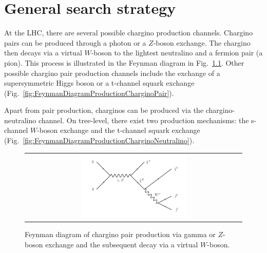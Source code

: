 \FloatBarrier
\chapter{General search strategy}
\label{sec:GeneralSearchStrategy}

At the LHC, there are several possible chargino production channels. 
Chargino pairs can be produced through a photon or a $Z$-boson exchange. 
The chargino then decays via a virtual $W$-boson to the lightest neutralino and a fermion pair (\eg a pion). 
This process is illustrated in the Feynman diagram in Fig.~\ref{fig:FeynmanDiagram}.
Other possible chargino pair production channels include the exchange of a supersymmetric Higgs boson or a t-channel squark exchange (Fig.~\ref{fig:FeynmanDiagramProductionCharginoPair}).

Apart from pair production, charginos can be produced via the chargino-neutralino channel. 
On tree-level, there exist two production mechanisms: the s-channel $W$-boson exchange and the t-channel squark exchange (Fig.~\ref{fig:FeynmanDiagramProductionCharginoNeutralino}).
\begin{figure}[!b]
  \centering 
  \begin{tabular}{c}
    \includegraphics[width=0.50\textwidth]{figures/analysis/ChiChi_ProductionAndDecay.pdf}
  \end{tabular}
  \caption{Feynman diagram of chargino pair production via gamma or $Z$-boson exchange and the subsequent decay via a virtual $W$-boson.}
  \label{fig:FeynmanDiagram}
\end{figure}

